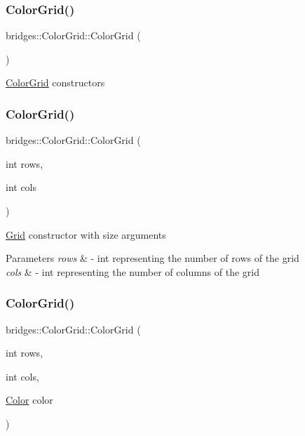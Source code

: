 \subsubsection{\texorpdfstring{Color\+Grid()}{ColorGrid()}\hspace{0.1cm}{\footnotesize\ttfamily [1/3]}}
{\footnotesize\ttfamily bridges\+::\+Color\+Grid\+::\+Color\+Grid (\begin{DoxyParamCaption}{ }\end{DoxyParamCaption})\hspace{0.3cm}{\ttfamily [inline]}}

\mbox{\hyperlink{classbridges_1_1_color_grid}{Color\+Grid}} constructors \mbox{\label{classbridges_1_1_color_grid_ac5fb993701683939d96fd7ac6515efc3}} 
\subsubsection{\texorpdfstring{Color\+Grid()}{ColorGrid()}\hspace{0.1cm}{\footnotesize\ttfamily [2/3]}}
{\footnotesize\ttfamily bridges\+::\+Color\+Grid\+::\+Color\+Grid (\begin{DoxyParamCaption}\item[{int}]{rows,  }\item[{int}]{cols }\end{DoxyParamCaption})\hspace{0.3cm}{\ttfamily [inline]}}

\mbox{\hyperlink{classbridges_1_1_grid}{Grid}} constructor with size arguments


\begin{DoxyParams}{Parameters}
{\em rows} & -\/ int representing the number of rows of the grid \\
\hline
{\em cols} & -\/ int representing the number of columns of the grid \\
\hline
\end{DoxyParams}
\mbox{\label{classbridges_1_1_color_grid_a4b731632c040f1fb05636127627603d5}} 
\subsubsection{\texorpdfstring{Color\+Grid()}{ColorGrid()}\hspace{0.1cm}{\footnotesize\ttfamily [3/3]}}
{\footnotesize\ttfamily bridges\+::\+Color\+Grid\+::\+Color\+Grid (\begin{DoxyParamCaption}\item[{int}]{rows,  }\item[{int}]{cols,  }\item[{\mbox{\hyperlink{classbridges_1_1_color}{Color}}}]{color }\end{DoxyParamCaption})\hspace{0.3cm}{\ttfamily [inline]}}

